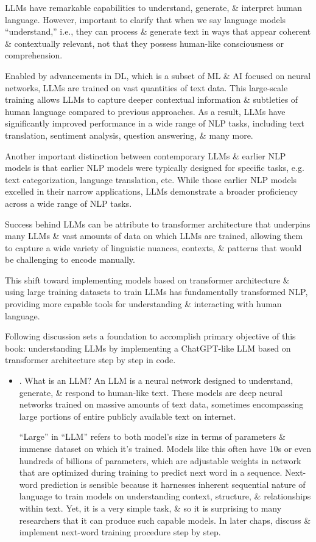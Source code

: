 \documentclass{article}
\begin{document}
\begin{itemize}
	LLMs have remarkable capabilities to understand, generate, \& interpret human language. However, important to clarify that when we say language models ``understand,'' i.e., they can process \& generate text in ways that appear coherent \& contextually relevant, not that they possess human-like consciousness or comprehension.
	
	Enabled by advancements in DL, which is a subset of ML \& AI focused on neural networks, LLMs are trained on vast quantities of text data. This large-scale training allows LLMs to capture deeper contextual information \& subtleties of human language compared to previous approaches. As a result, LLMs have significantly improved performance in a wide range of NLP tasks, including text translation, sentiment analysis, question answering, \& many more.
	
	Another important distinction between contemporary LLMs \& earlier NLP models is that earlier NLP models were typically designed for specific tasks, e.g. text categorization, language translation, etc. While those earlier NLP models excelled in their narrow applications, LLMs demonstrate a broader proficiency across a wide range of NLP tasks.
	
	Success behind LLMs can be attribute to transformer architecture that underpins many LLMs \& vast amounts of data on which LLMs are trained, allowing them to capture a wide variety of linguistic nuances, contexts, \& patterns that would be challenging to encode manually.
	
	This shift toward implementing models based on transformer architecture \& using large training datasets to train LLMs has fundamentally transformed NLP, providing more capable tools for understanding \& interacting with human language.
	
	Following discussion sets a foundation to accomplish primary objective of this book: understanding LLMs by implementing a ChatGPT-like LLM based on transformer architecture step by step in code.
	\begin{itemize}
		\item {. What is an LLM?} An LLM is a neural network designed to understand, generate, \& respond to human-like text. These models are deep neural networks trained on massive amounts of text data, sometimes encompassing large portions of entire publicly available text on internet.
		
		``Large'' in ``LLM'' refers to both model's size in terms of parameters \& immense dataset on which it's trained. Models like this often have 10s or even hundreds of billions of parameters, which are adjustable weights in network that are optimized during training to predict next word in a sequence. Next-word prediction is sensible because it harnesses inherent sequential nature of language to train models on understanding context, structure, \& relationships within text. Yet, it is a very simple task, \& so it is surprising to many researchers that it can produce such capable models. In later chaps, discuss \& implement next-word training procedure step by step.
		

\end{itemize}
\end{itemize}
\end{document}
